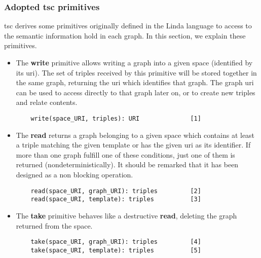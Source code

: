 


\subsubsection{Adopted \acs{tsc} primitives}
\label{sec:primitives}

\acs{tsc} derives some primitives originally defined in the Linda language \citep{gelernter_generative_1985} to access to the semantic information hold in each graph.
In this section, we explain these primitives.

\begin{itemize}
 \item The \textbf{write} primitive allows writing a graph into a given space (identified by its \acs{uri}).
	The set of triples received by this primitive will be stored together in the same graph, returning the \acs{uri} which identifies that graph.
	The graph \acs{uri} can be used to access directly to that graph later on, or to create new triples and relate contents.
  \begin{lstlisting}
    write(space_URI, triples): URI              [1]
  \end{lstlisting}


  \item The \textbf{read} returns a graph belonging to a given space which contains at least a triple matching the given template or has the given \acs{uri} as its identifier.
	If more than one graph fulfill one of these conditions, just one of them is returned (nondeterministically).
	It should be remarked that it has been designed as a non blocking operation.
  \begin{lstlisting}
    read(space_URI, graph_URI): triples         [2]
    read(space_URI, template): triples          [3]
  \end{lstlisting}
  
  
  \item The \textbf{take} primitive behaves like a destructive \textbf{read}, deleting the graph returned from the space.
  \begin{lstlisting}
    take(space_URI, graph_URI): triples         [4]
    take(space_URI, template): triples          [5]
  \end{lstlisting}

\end{itemize}



